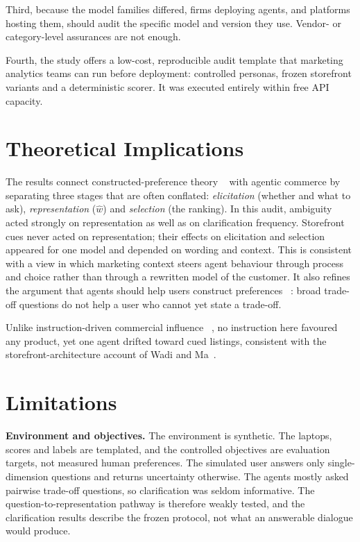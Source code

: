 \documentclass[conference]{IEEEtran}
\begin{document}
Third, because the model families differed, firms deploying agents, and platforms hosting them, should audit the specific model and version they use. Vendor- or category-level assurances are not enough.

Fourth, the study offers a low-cost, reproducible audit template that marketing analytics teams can run before deployment: controlled personas, frozen storefront variants and a deterministic scorer. It was executed entirely within free API capacity.

\section{Theoretical Implications}

The results connect constructed-preference theory ~\cite{bettman1998constructive} with agentic commerce by separating three stages that are often conflated: \emph{elicitation} (whether and what to ask), \emph{representation} ($\hat{w}$) and \emph{selection} (the ranking). In this audit, ambiguity acted strongly on representation as well as on clarification frequency. Storefront cues never acted on representation; their effects on elicitation and selection appeared for one model and depended on wording and context. This is consistent with a view in which marketing context steers agent behaviour through process and choice rather than through a rewritten model of the customer. It also refines the argument that agents should help users construct preferences ~\cite{saracay2026beyond}: broad trade-off questions do not help a user who cannot yet state a trade-off.

Unlike instruction-driven commercial influence ~\cite{li2026selective,wadi2026whom}, no instruction here favoured any product, yet one agent drifted toward cued listings, consistent with the storefront-architecture account of Wadi and Ma~\cite{wadi2026shopping}.

\section{Limitations}

\textbf{Environment and objectives.} The environment is synthetic. The laptops, scores and labels are templated, and the controlled objectives are evaluation targets, not measured human preferences. The simulated user answers only single-dimension questions and returns uncertainty otherwise. The agents mostly asked pairwise trade-off questions, so clarification was seldom informative. The question-to-representation pathway is therefore weakly tested, and the clarification results describe the frozen protocol, not what an answerable dialogue would produce.
\end{document}
